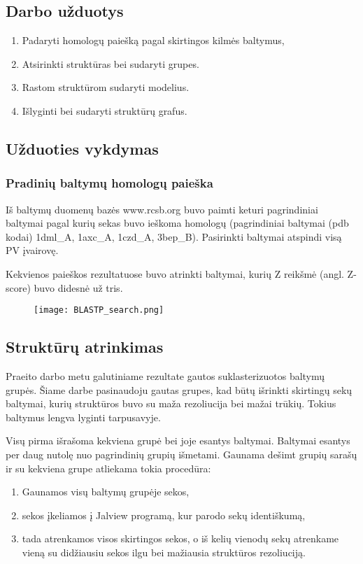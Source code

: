 \documentclass[a4paper,12pt]{article}
\begin{document}
\subsection{Darbo užduotys}
\begin{enumerate}
	\item Padaryti homologų paiešką pagal skirtingos kilmės baltymus,
	\item Atsirinkti struktūras bei sudaryti grupes.
	\item Rastom struktūrom sudaryti modelius.
	\item Išlyginti bei sudaryti struktūrų grafus.
\end{enumerate}

\subsection{Užduoties vykdymas}

\subsubsection{Pradinių baltymų homologų paieška}

\qquad Iš baltymų duomenų bazės www.rcsb.org buvo paimti keturi pagrindiniai baltymai pagal kurių sekas buvo ieškoma homologų (pagrindiniai baltymai (pdb kodai) 1dml\_A, 1axc\_A, 1czd\_A, 3bep\_B).
Pasirinkti baltymai atspindi visą PV įvairovę.

\qquad Kekvienos paieškos rezultatuose buvo atrinkti baltymai, kurių Z reikšmė (angl. Z-score) buvo didesnė už tris.


\begin{figure}[!tph]
	\centering
    \texttt{[image: BLASTP\_search.png]}
    \label{fig:verticalcell}
\end{figure}


\subsection{Struktūrų atrinkimas}

\qquad Praeito darbo metu galutiniame rezultate gautos suklasterizuotos baltymų grupės. Šiame darbe pasinaudoju gautas grupes, kad būtų išrinkti skirtingų sekų baltymai, kurių struktūros buvo su maža rezoliucija bei mažai trūkių. Tokius baltymus lengva lyginti tarpusavyje.  

\qquad Visų pirma išrašoma kekviena grupė bei joje esantys baltymai. Baltymai esantys per daug nutolę nuo pagrindinių grupių išmetami. Gaunama dešimt grupių sarašų ir su kekviena grupe atliekama tokia procedūra:
\begin{enumerate}
	\item Gaunamos visų baltymų grupėje sekos,
	\item sekos įkeliamos į Jalview programą, kur parodo sekų identiškumą,
	\item tada atrenkamos visos skirtingos sekos, o iš kelių vienodų sekų atrenkame vieną su didžiausiu sekos ilgu bei mažiausia struktūros rezoliuciją.
\end{enumerate}
\end{document}
